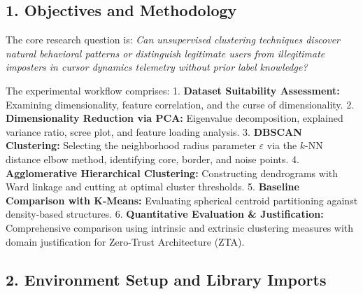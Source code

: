 \documentclass[11pt]{article}
\begin{document}
    \subsection{1. Objectives and
Methodology}\label{objectives-and-methodology}

The core research question is: \emph{Can unsupervised clustering
techniques discover natural behavioral patterns or distinguish
legitimate users from illegitimate imposters in cursor dynamics
telemetry without prior label knowledge?}

The experimental workflow comprises: 1. \textbf{Dataset Suitability
Assessment:} Examining dimensionality, feature correlation, and the
curse of dimensionality. 2. \textbf{Dimensionality Reduction via PCA:}
Eigenvalue decomposition, explained variance ratio, scree plot, and
feature loading analysis. 3. \textbf{DBSCAN Clustering:} Selecting the
neighborhood radius parameter \(\varepsilon\) via the \(k\)-NN distance
elbow method, identifying core, border, and noise points. 4.
\textbf{Agglomerative Hierarchical Clustering:} Constructing dendrograms
with Ward linkage and cutting at optimal cluster thresholds. 5.
\textbf{Baseline Comparison with K-Means:} Evaluating spherical centroid
partitioning against density-based structures. 6. \textbf{Quantitative
Evaluation \& Justification:} Comprehensive comparison using intrinsic
and extrinsic clustering measures with domain justification for
Zero-Trust Architecture (ZTA).

    \subsection{2. Environment Setup and Library
Imports}\label{environment-setup-and-library-imports}
\end{document}
